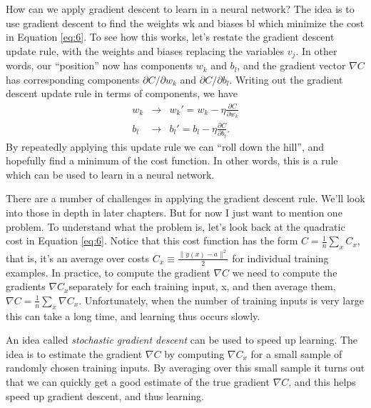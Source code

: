 \documentclass[a4paper,twoside,10pt]{book}
\begin{document}
How can we apply gradient descent to learn in a neural network? The idea is to use gradient descent to find the weights wk and biases bl which minimize the cost in Equation \ref{eq:6}. To see how this works, let's restate the gradient descent update rule, with the weights and biases replacing the variables $v_j$. In other words, our ``position'' now has components $w_k$ and $b_l$, and the gradient vector $\nabla C$ has corresponding components $\partial C/\partial w_k$ and $\partial C / \partial b_l$. Writing out the gradient descent update rule in terms of components, we have
\begin{eqnarray}
w_k & \to & w_k' = w_k-\eta \frac{\partial C}{\partial w_k}\\
b_l & \to & b_l' = b_l-\eta \frac{\partial C}{\partial b_l}.
\end{eqnarray}
By repeatedly applying this update rule we can ``roll down the hill'', and hopefully find a minimum of the cost function. In other words, this is a rule which can be used to learn in a neural network.

There are a number of challenges in applying the gradient descent rule. We'll look into those in depth in later chapters. But for now I just want to mention one problem. To understand what the problem is, let's look back at the quadratic cost in Equation \ref{eq:6}. Notice that this cost function has the form $C = \frac{1}{n} \sum_x C_x$, that is, it's an average over costs $C_x \equiv \frac{\|y(x)-a\|^2}{2}$ for individual training examples. In practice, to compute the gradient $\nabla C$ we need to  compute the gradients $\nabla C_x$separately for each training input, x, and then average them, $\nabla C = \frac{1}{n}\sum_x \nabla C_x$. Unfortunately, when the number of training inputs is very large this can take a long time, and learning thus occurs slowly.

An idea called \textit{stochastic gradient descent} can be used to speed up learning. The idea is to estimate the gradient $\nabla C$ by computing $\nabla C_x$ for a small sample of randomly chosen training inputs. By averaging over this small sample it turns out that we can quickly get a good estimate of the true gradient $\nabla C$, and this helps speed up gradient descent, and thus learning.
\end{document}
